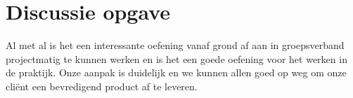 \documentclass[a4paper, 11pt]{article}
\begin{document}
\section*{Discussie opgave}
  Al met al is het een interessante oefening vanaf grond af aan in groepsverband projectmatig te kunnen werken en
  is het een goede oefening voor het werken in de praktijk. Onze aanpak is duidelijk en we kunnen allen goed op weg
  om onze cli\"ent een bevredigend product af te leveren.
\end{document}
